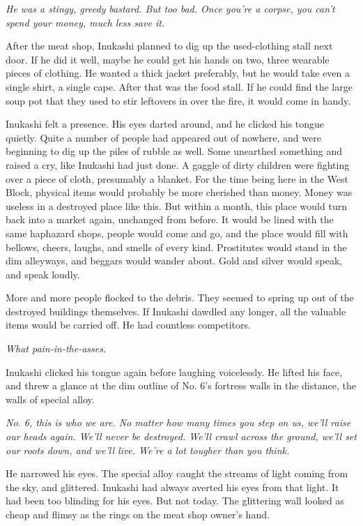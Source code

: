 \emph{He was a stingy, greedy bastard. But too bad. Once you're a corpse, you
can't spend your money, much less save it.}

After the meat shop, Inukashi planned to dig up the used-clothing stall
next door. If he did it well, maybe he could get his hands on two, three
wearable pieces of clothing. He wanted a thick jacket preferably, but he
would take even a single shirt, a single cape. After that was the food
stall. If he could find the large soup pot that they used to stir
leftovers in over the fire, it would come in handy.

Inukashi felt a presence. His eyes darted around, and he clicked his
tongue quietly. Quite a number of people had appeared out of nowhere,
and were beginning to dig up the piles of rubble as well. Some unearthed
something and raised a cry, like Inukashi had just done. A gaggle of
dirty children were fighting over a piece of cloth, presumably a
blanket. For the time being here in the West Block, physical items would
probably be more cherished than money. Money was useless in a destroyed
place like this. But within a month, this place would turn back into a
market again, unchanged from before. It would be lined with the same
haphazard shops, people would come and go, and the place would fill with
bellows, cheers, laughs, and smells of every kind. Prostitutes would
stand in the dim alleyways, and beggars would wander about. Gold and
silver would speak, and speak loudly.

More and more people flocked to the debris. They seemed to spring up out
of the destroyed buildings themselves. If Inukashi dawdled any longer,
all the valuable items would be carried off. He had countless
competitors.

\emph{What pain-in-the-asses.}

Inukashi clicked his tongue again before laughing voicelessly. He lifted
his face, and threw a glance at the dim outline of No. 6's fortress
walls in the distance, the walls of special alloy.

\emph{No. 6, this is who we are. No matter how many times you step on us,
we'll raise our heads again. We'll never be destroyed. We'll crawl
across the ground, we'll set our roots down, and we'll live. We're a lot
tougher than you think.}

He narrowed his eyes. The special alloy caught the streams of light
coming from the sky, and glittered. Inukashi had always averted his eyes
from that light. It had been too blinding for his eyes. But not today.
The glittering wall looked as cheap and flimsy as the rings on the meat
shop owner's hand.

